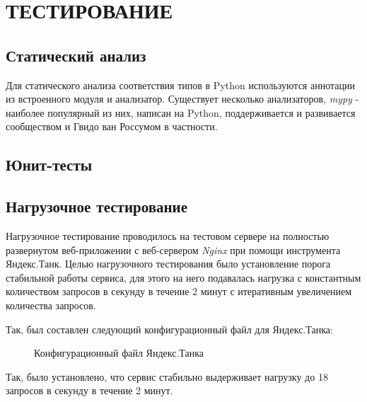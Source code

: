 \section{ТЕСТИРОВАНИЕ}
    \subsection{Статический анализ}
    Для статического анализа соответствия типов в Python используются аннотации 
    из встроенного модуля  и анализатор.
    Существует несколько анализаторов, \textit{mypy} - наиболее популярный из них,
    написан на Python, поддерживается и развивается сообществом
    и Гвидо ван Россумом в частности.

    \subsection{Юнит-тесты}

    \subsection{Нагрузочное тестирование}
    Нагрузочное тестирование проводилось на тестовом сервере на полностью
    развернутом веб-приложении с веб-сервером \textit{Nginx} при помощи
    инструмента Яндекс.Танк. Целью нагрузочного тестирования было установление
    порога стабильной работы сервиса, для этого на него подавалась нагрузка
    с константным количеством запросов в секунду в течение 2 минут с итеративным
    увеличением количества запросов.

    Так, был составлен следующий конфигурационный файл для Яндекс.Танка:
    \begin{figure}[!h]
        \centering
        
        \caption{Конфигурационный файл Яндекс.Танка}
        \label{fig:tank_load}
    \end{figure}

    Так, было установлено, что сервис стабильно выдерживает нагрузку до 18
    запросов в секунду в течение 2 минут.
